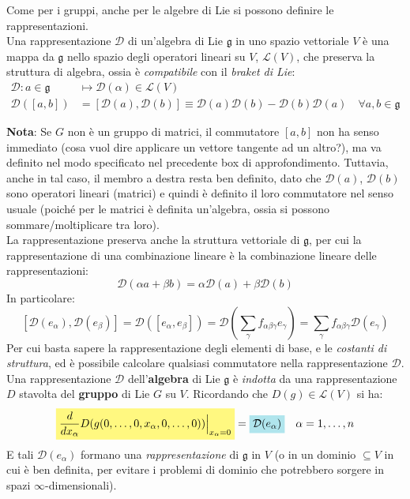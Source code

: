 \documentclass[../../FisicaTeorica.tex]{subfiles}
\begin{document}
Come per i gruppi, anche per le algebre di Lie si possono definire le rappresentazioni.\\
Una rappresentazione $\mathcal{D}$ di un'algebra di Lie $\mathfrak{g}$ in uno spazio vettoriale $V$ è una mappa da $\mathfrak{g}$ nello spazio degli operatori lineari su $V$, $\mathcal{L}(V)$, che preserva la struttura di algebra, ossia è \textit{compatibile} con il \textit{braket di Lie}:
\begin{align*}
\mathcal{D}: a \in \mathfrak{g} &\mapsto \mathcal{D}(\alpha) \in \mathcal{L}(V)\\
\mathcal{D}([a,b])&=[\mathcal{D}(a),\mathcal{D}(b)] \equiv \mathcal{D}(a)\mathcal{D}(b)-\mathcal{D}(b)\mathcal{D}(a) \quad \forall a,b\in \mathfrak{g}
\end{align*}

\textbf{Nota}: Se $G$ non è un gruppo di matrici, il commutatore $[a,b]$ non ha senso immediato (cosa vuol dire applicare un vettore tangente ad un altro?), ma va definito nel modo specificato nel precedente box di approfondimento. Tuttavia, anche in tal caso, il membro a destra resta ben definito, dato che $\mathcal{D}(a)$, $\mathcal{D}(b)$ sono operatori lineari (matrici) e quindi è definito il loro commutatore nel senso usuale (poiché per le matrici è definita un'algebra, ossia si possono sommare/moltiplicare tra loro).\\

La rappresentazione preserva anche la struttura vettoriale di $\mathfrak{g}$, per cui la rappresentazione di una combinazione lineare è la combinazione lineare delle rappresentazioni:
\[
\mathcal{D}(\alpha a + \beta b) = \alpha \mathcal{D}(a) + \beta \mathcal{D}(b)
\]
In particolare:
\[
[\mathcal{D}(e_\alpha), \mathcal{D}(e_\beta)]=\mathcal{D}([e_\alpha, e_\beta])=\mathcal{D}(\sum_\gamma f_{\alpha \beta \gamma} e_\gamma)=\sum_\gamma f_{\alpha \beta \gamma} \mathcal{D}(e_\gamma)
\]
Per cui basta sapere la rappresentazione degli elementi di base, e le \textit{costanti di struttura}, ed è possibile calcolare qualsiasi commutatore nella rappresentazione $\mathcal{D}$.\\

Una rappresentazione $\mathcal{D}$ dell'\textbf{algebra} di Lie $\mathfrak{g}$ è \textit{indotta} da una rappresentazione $D$ stavolta del \textbf{gruppo} di Lie $G$ su $V$. Ricordando che $D(g) \in \mathcal{L}(V)$ si ha:
\begin{equation}
\hlc{Yellow}{\frac{d}{dx_\alpha}D(g(0,\dots,0,x_\alpha,0,\dots, 0))\Big|_{x_\alpha=0}}= \hlc{SkyBlue}{\mathcal{D}(e_\alpha)} \quad \alpha = 1,\dots, n
\label{eqn:rappresentazioni-gruppo-algebra}
\end{equation}
E tali $\mathcal{D}(e_\alpha)$ formano una \textit{rappresentazione} di $\mathfrak{g}$ in $V$ (o in un dominio $\subseteq V$ in cui è ben definita, per evitare i problemi di dominio che potrebbero sorgere in spazi $\infty$-dimensionali).\\
\end{document}
